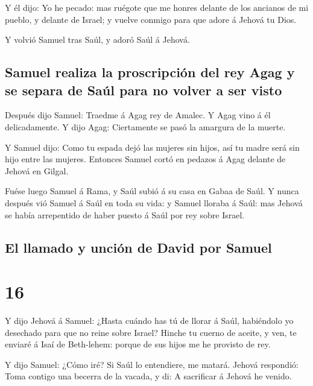  Y él dijo: Yo he pecado: mas ruégote que me honres
delante de los ancianos de mi pueblo, y delante de Israel; y vuelve
conmigo para que adore á Jehová tu Dios.

 Y volvió Samuel tras Saúl, y adoró Saúl á Jehová.

\hypertarget{samuel-realiza-la-proscripciuxf3n-del-rey-agag-y-se-separa-de-sauxfal-para-no-volver-a-ser-visto}{%
\subsection{Samuel realiza la proscripción del rey Agag y se separa de
Saúl para no volver a ser
visto}\label{samuel-realiza-la-proscripciuxf3n-del-rey-agag-y-se-separa-de-sauxfal-para-no-volver-a-ser-visto}}

 Después dijo Samuel: Traedme á Agag rey de Amalec. Y
Agag vino á él delicadamente. Y dijo Agag: Ciertamente se pasó la
amargura de la muerte.

 Y Samuel dijo: Como tu espada dejó las mujeres sin
hijos, así tu madre será sin hijo entre las mujeres. Entonces Samuel
cortó en pedazos á Agag delante de Jehová en Gilgal.

 Fuése luego Samuel á Rama, y Saúl subió á su casa en
Gabaa de Saúl.  Y nunca después vió Samuel á Saúl en toda
su vida: y Samuel lloraba á Saúl: mas Jehová se había arrepentido de
haber puesto á Saúl por rey sobre Israel.

\hypertarget{el-llamado-y-unciuxf3n-de-david-por-samuel}{%
\subsection{El llamado y unción de David por
Samuel}\label{el-llamado-y-unciuxf3n-de-david-por-samuel}}

\hypertarget{section-09-16}{%
\section{16}\label{section-09-16}}

 Y dijo Jehová á Samuel: ¿Hasta cuándo has tú de llorar á
Saúl, habiéndolo yo desechado para que no reine sobre Israel? Hinche tu
cuerno de aceite, y ven, te enviaré á Isaí de Beth-lehem: porque de sus
hijos me he provisto de rey.

 Y dijo Samuel: ¿Cómo iré? Si Saúl lo entendiere, me
matará. Jehová respondió: Toma contigo una becerra de la vacada, y di: A
sacrificar á Jehová he venido.

